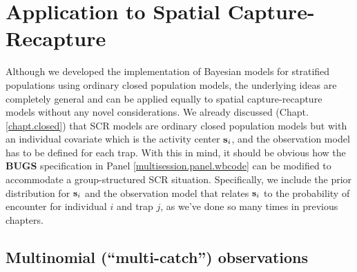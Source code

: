 \section{Application to Spatial Capture-Recapture}

Although we developed the implementation of Bayesian models for
stratified populations using ordinary closed population models, the
underlying ideas are completely general and can be applied equally to
spatial capture-recapture models without any novel considerations.  We
already discussed (Chapt. \ref{chapt.closed}) that SCR models are
ordinary closed population models but with an individual covariate
which is the activity center ${\bf s}_{i}$, and the observation model
has to be defined for each trap. With this in mind, it should be
obvious how the {\bf BUGS} specification in Panel
\ref{multisession.panel.wbcode} can be modified to accommodate a
group-structured SCR situation.  Specifically, we include the prior
distribution for ${\bf s}_{i}$ and the observation model that relates
${\bf s}_{i}$ to the probability of encounter for individual $i$ and
trap $j$, as we've done so many times in previous chapters.

\subsection{Multinomial (``multi-catch'') observations}

